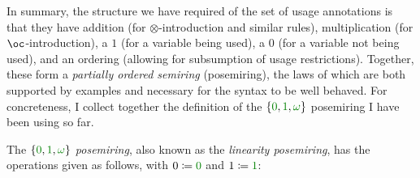 In summary, the structure we have required of the set of usage annotations is
that they have addition (for $\otimes$-introduction and similar rules),
multiplication (for $\oc$-introduction), a $1$ (for a variable being used), a
$0$ (for a variable not being used), and an ordering (allowing for subsumption
of usage restrictions).
Together, these form a \emph{partially ordered semiring} (posemiring), the laws
of which are both supported by examples and necessary for the syntax to be well
behaved.
For concreteness, I collect together the definition of the
$\{\gr0, \gr1, \gr\omega\}$ posemiring I have been using so far.

\begin{example}\label{def:lin-semiring}
  The \emph{$\{\gr0, \gr1, \gr\omega\}$ posemiring}, also known as the
  \emph{linearity posemiring}, has the operations given as follows, with
  $0 \coloneqq \gr0$ and $1 \coloneqq \gr1$:

\end{example}


